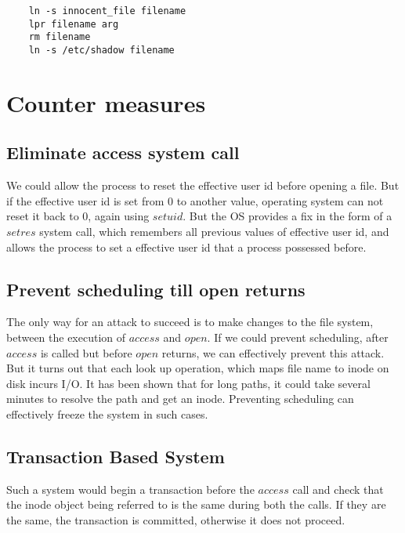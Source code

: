 \documentclass[11pt]{article} %
\begin{document}
\begin{verbatim}
    ln -s innocent_file filename
    lpr filename arg
   	rm filename
    ln -s /etc/shadow filename
\end{verbatim}

\section {Counter measures}
\subsection {Eliminate access system call}
We could allow the process to reset the effective user id before opening a file.
But if the effective user id is set from $0$ to another value, operating system
can not reset it back to $0$, again using $setuid$. But the OS provides a fix
in the form of a $setres$ system call, which remembers all previous values of
effective user id, and allows the process to set a effective user id that a
process possessed before.

\subsection {Prevent scheduling till open returns}
The only way for an attack to succeed is to make changes to the file system,
between the execution of $access$ and $open$. If we could prevent scheduling, after
$access$ is called but before $open$ returns, we can effectively prevent this
 attack. But it turns out that each look up operation, which maps file name
 to inode on disk incurs I/O. It has been shown that for long paths, it could take several minutes to resolve
the path and get an inode. Preventing scheduling can effectively freeze the
system in such cases.

\subsection {Transaction Based System}
Such a system would begin a transaction before the $access$ call and check that
the inode object being referred to is the same during both the calls. If they are the
same, the transaction is committed, otherwise it does not proceed.
\end{document}
